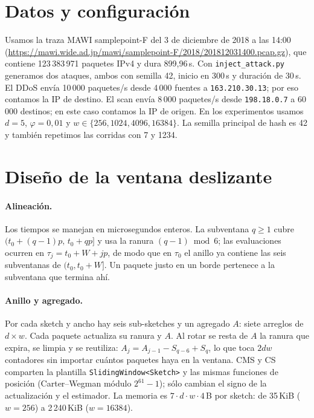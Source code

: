 \documentclass[11pt]{article}
\newcommand{\code}[1]{\texttt{#1}}
\begin{document}
\section{Datos y configuración}

Usamos la traza MAWI samplepoint-F del 3 de diciembre de 2018 a las 14:00 (\url{https://mawi.wide.ad.jp/mawi/samplepoint-F/2018/201812031400.pcap.gz}), que contiene 123\,383\,971 paquetes IPv4 y dura 899,96\,s. Con \code{inject\_attack.py} generamos dos ataques, ambos con semilla 42, inicio en 300\,s y duración de 30\,s. El DDoS envía 10\,000 paquetes/s desde 4\,000 fuentes a \code{163.210.30.13}; por eso contamos la IP de destino. El scan envía 8\,000 paquetes/s desde \code{198.18.0.7} a 60\,000 destinos; en este caso contamos la IP de origen. En los experimentos usamos $d=5$, $\varphi=0{,}01$ y $w\in\{256,1024,4096,16384\}$. La semilla principal de hash es 42 y también repetimos las corridas con 7 y 1234.

\section{Diseño de la ventana deslizante}

\paragraph{Alineación.} Los tiempos se manejan en microsegundos enteros. La subventana $q\ge1$ cubre $(t_0+(q-1)p,\,t_0+qp]$ y usa la ranura $(q-1)\bmod 6$; las evaluaciones ocurren en $\tau_j=t_0+W+jp$, de modo que en $\tau_0$ el anillo ya contiene las seis subventanas de $(t_0,t_0+W]$. Un paquete justo en un borde pertenece a la subventana que termina ahí.

\paragraph{Anillo y agregado.} Por cada sketch y ancho hay seis sub-sketches y un agregado $A$: siete arreglos de $d\times w$. Cada paquete actualiza su ranura y $A$. Al rotar se resta de $A$ la ranura que expira, se limpia y se reutiliza: $A_j=A_{j-1}-S_{q-6}+S_q$, lo que toca $2dw$ contadores sin importar cuántos paquetes haya en la ventana. CMS y CS comparten la plantilla \code{SlidingWindow<Sketch>} y las mismas funciones de posición (Carter--Wegman módulo $2^{61}-1$); sólo cambian el signo de la actualización y el estimador. La memoria es $7\cdot d\cdot w\cdot 4$\,B por sketch: de 35\,KiB ($w=256$) a 2\,240\,KiB ($w=16384$).
\end{document}
